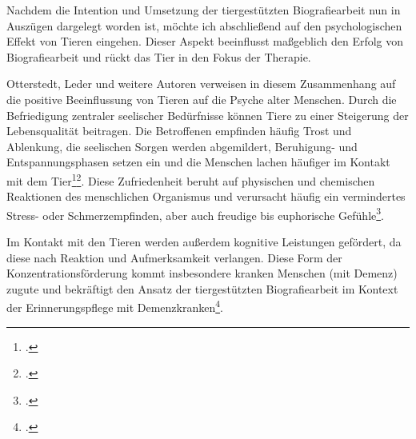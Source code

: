 Nachdem die Intention und Umsetzung der tiergestützten Biografiearbeit nun in Auszügen dargelegt worden ist, möchte ich abschließend auf den psychologischen Effekt von Tieren eingehen. Dieser Aspekt beeinflusst maßgeblich den Erfolg von Biografiearbeit und rückt das Tier in den Fokus der Therapie.

Otterstedt, Leder und weitere Autoren verweisen in diesem Zusammenhang auf die positive Beeinflussung von Tieren auf die Psyche alter Menschen. Durch die Befriedigung zentraler seelischer Bedürfnisse können Tiere zu einer Steigerung der Lebensqualität beitragen. Die Betroffenen empfinden häufig Trost und Ablenkung, die seelischen Sorgen werden abgemildert, Beruhigung- und Entspannungsphasen setzen ein und die Menschen lachen häufiger im Kontakt mit dem Tier\footcite[27f]{Otterstedt2001}\footcite[75]{Leder2006}. Diese Zufriedenheit beruht auf physischen und chemischen Reaktionen des menschlichen Organismus und verursacht häufig ein vermindertes Stress- oder Schmerzempfinden, aber auch freudige bis euphorische Gefühle\footcite[75]{Leder2006}. 

Im Kontakt mit den Tieren werden außerdem kognitive Leistungen gefördert, da diese nach Reaktion und Aufmerksamkeit verlangen. Diese Form der Konzentrationsförderung kommt insbesondere kranken Menschen (mit Demenz) zugute und bekräftigt den Ansatz der tiergestützten Biografiearbeit im Kontext der Erinnerungspflege mit Demenzkranken\footcite[76]{Leder2006}.
